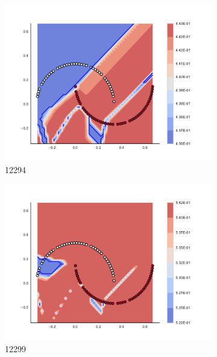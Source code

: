 \begin{figure}[h]
\begin{subfigure}[b]{0.09\textwidth}
    \includegraphics[clip, trim=2.35cm 1.75cm 4.5cm 0cm,width=\textwidth]{img/convergence/12294.pdf}
    \caption{12294}
    \label{fig:convergence_12294}
\end{subfigure}
%
\begin{subfigure}[b]{0.09\textwidth}
    \includegraphics[clip, trim=2.35cm 1.75cm 4.5cm 0cm,width=\textwidth]{img/convergence/12299.pdf}
    \caption{12299}
    \label{fig:convergence_12299}
\end{subfigure}
%
\begin{subfigure}[b]{0.09\textwidth}

\end{subfigure}
\end{figure}
